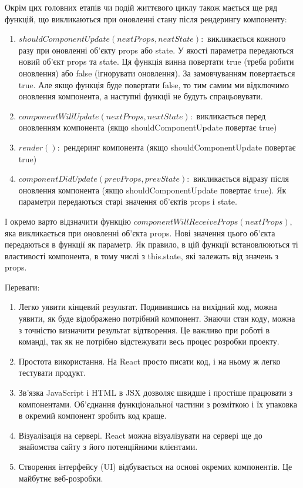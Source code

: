 Окрім цих головних етапів чи подій життєвого циклу також мається ще ряд функцій, що викликаються при оновленні стану після рендерингу компоненту:
\begin{enumerate}
    \item $shouldComponentUpdate(nextProps, nextState):$ викликається кожного разу при оновленні об'єкту props або state. У якості параметра передаються новий об'єкт props та state. Ця функція винна повертати true (треба робити оновлення) або false (ігнорувати оновлення). За замовчуванням повертається true. Але якщо функція буде повертати false, то тим самим ми відключимо оновлення компонента, а наступні функції не будуть спрацьовувати.
    \item $componentWillUpdate (nextProps, nextState):$ викликається перед оновленням компонента (якщо shouldComponentUpdate повертає true)
    \item $render ():$ рендеринг компонента (якщо shouldComponentUpdate повертає true)
    \item $componentDidUpdate (prevProps, prevState):$ викликається відразу після оновлення компонента (якщо shouldComponentUpdate повертає true). Як параметри передаються старі значення об'єктів props і state.
\end{enumerate}

І окремо варто відзначити функцію $componentWillReceiveProps(nextProps),$ яка викликається при оновленні об'єкта props. Нові значення цього об'єкта передаються в функції як параметр. Як правило, в цій функції встановлюються ті властивості компонента, в тому числі з this.state, які залежать від значень з props.

Переваги:
\begin{enumerate}
    \item Легко уявити кінцевий результат. Подивившись на вихідний код, можна уявити, як буде відображено потрібний компонент. Знаючи стан коду, можна з точністю визначити результат відтворення. Це важливо при роботі в команді, так як не потрібно відстежувати весь процес розробки проекту.
    \item Простота використання. На React просто писати код, і на ньому ж легко тестувати продукт.
    \item Зв'язка JavaScript і HTML в JSX дозволяє швидше і простіше працювати з компонентами. Об'єднання функціональної частини з розміткою і їх упаковка в окремий компонент зробить код краще.
    \item Візуалізація на сервері. React можна візуалізувати на сервері ще до знайомства сайту з його потенційними клієнтами.
    \item Створення інтерфейсу (UI) відбувається на основі окремих компонентів. Це майбутнє веб-розробки.
    
\end{enumerate}

